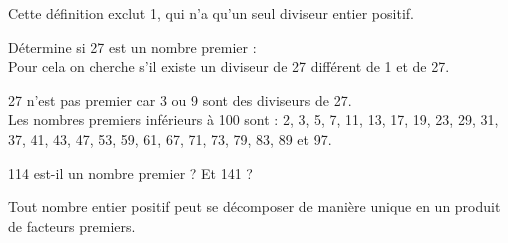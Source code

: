 \begin{remarque}
Cette définition exclut 1, qui n'a qu'un seul diviseur entier positif.
 \end{remarque}


\vspace{6em}


\begin{methode*1}


 \begin{exemple*1}
 Détermine si 27 est un nombre premier : \\[1em]
 Pour cela on cherche s'il existe un diviseur de 27 différent de 1 et de 27.
 
27 n'est pas premier car 3 ou 9 sont des diviseurs de 27. \\[1em]
  \textcolor{A1}{Les nombres premiers inférieurs à 100 sont : 2, 3, 5, 7, 11, 13, 17, 19, 23, 29, 31, 37, 41, 43, 47, 53, 59, 61, 67, 71, 73, 79, 83, 89 et 97.}
  \end{exemple*1}

\exercice  

114 est-il un nombre premier ? Et 141 ?

 \end{methode*1}


\vspace{6em}


\begin{aconnaitre}
Tout nombre entier positif peut se décomposer de manière unique en un produit de facteurs premiers.
\end{aconnaitre}

\newpage

